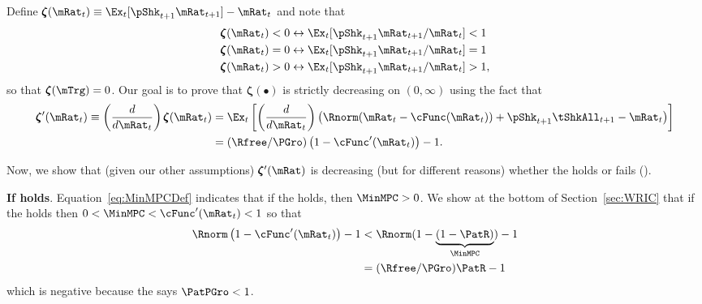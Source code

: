 \documentclass[\econtexRoot/BufferStockTheory]{subfiles}
\begin{document}
Define \providecommand{\difFunc}{\pmb{\zeta}} $\difFunc(\mRat_t) \equiv 
\Ex_t[\pShk_{t+1}\mRat_{t+1}] - \mRat_t$ and note that
\begin{align}\label{eq:difLevEquiv}
  \difFunc(\mRat_t) < 0 &\leftrightarrow \Ex_t[\pShk_{t+1}\mRat_{t+1}/\mRat_{t}] < 1 
                          \nonumber\\
  \difFunc(\mRat_t) = 0 &\leftrightarrow \Ex_t[\pShk_{t+1}\mRat_{t+1}/\mRat_{t}] = 1\\
  \difFunc(\mRat_t) > 0 &\leftrightarrow \Ex_t[\pShk_{t+1}\mRat_{t+1}/\mRat_{t}] > 
                          1,\nonumber
\end{align}
so that $\difFunc(\mTrg)=0$. Our goal is to prove that $\difFunc(\bullet)$ is strictly 
decreasing on $(0,\infty)$ using the fact that
\begin{align}
  \difFunc^{\prime}(\mRat_{t}) \equiv  \left( \frac{d}{d\mRat_{t}}\right) \difFunc(\mRat_t)  & = \Ex_{t}\left[
                                                                                               \left( \frac{d}{d\mRat_{t}}\right) \left( 
                                                                                               {\Rnorm}(\mRat_{t}-\cFunc(\mRat_{t}))+%
                                                                                               {\pShk}_{t+1}{\tShkAll}_{t+1} - {\mRat}_t\right) \right] \label{eq:difFuncDecreases} \\
                                                                                             & = (\Rfree/\PGro)\left(1-\cFunc^{\prime}({\mRat}_t)\right) - 1.  \notag
\end{align}

Now, we show that (given our other assumptions) $\difFunc^{\prime}(\mRat)$ is decreasing (but for different reasons) whether the {\RIC} holds or fails (\cncl{\RIC}).

\textbf{If {\RIC} holds}. Equation~\eqref{eq:MinMPCDef} indicates that if the {\RIC} holds, then $\MinMPC >0$.  We show at the bottom of Section~\ref{sec:WRIC} that if the {\RIC} holds then $0 < \MinMPC < \cFunc^{\prime}(\mRat_{t}) < 1$ so that 
\begin{align*}
  \Rnorm\left(1-\cFunc^{\prime}({\mRat}_t)\right) - 1 & <  \Rnorm(1-\underbrace{(1-\PatR)}_{\MinMPC}) - 1  \\
                                                      & = (\Rfree/\PGro)\PatR - 1 
\end{align*}
which is negative because the {\GICRaw} says $\PatPGro < 1$.  
\end{document}
